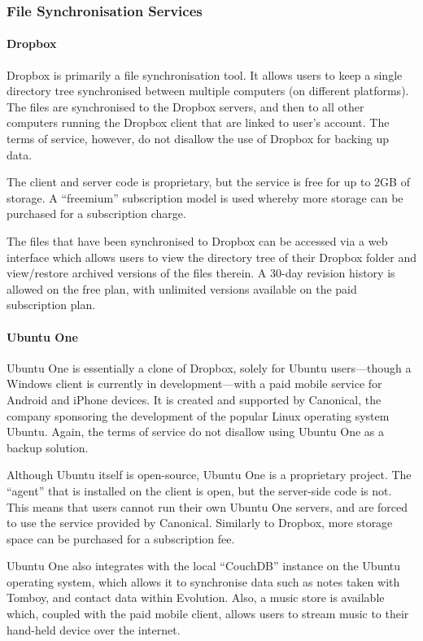 \begin{bibunit}[plain]
\subsubsection{File Synchronisation Services}

\paragraph{Dropbox}

Dropbox is primarily a file synchronisation tool. It allows users to keep
a single directory tree synchronised between multiple computers (on different
platforms). The files are synchronised to the Dropbox servers, and then to all
other computers running the Dropbox client that are linked to user's account.
The terms of service, however, do not disallow the use of Dropbox for backing
up data.

The client and server code is proprietary, but the service is free for up to
2GB of storage. A ``freemium'' subscription model is used whereby more storage
can be purchased for a subscription charge.

The files that have been synchronised to Dropbox can be accessed via a web
interface which allows users to view the directory tree of their Dropbox folder
and view/restore archived versions of the files therein. A 30-day revision
history is allowed on the free plan, with unlimited versions available on the
paid subscription plan.

\paragraph{Ubuntu One}

Ubuntu One is essentially a clone of Dropbox, solely for Ubuntu users---though
a Windows client is currently in development---with a paid mobile service for
Android and iPhone devices. It is created and supported by Canonical, the
company sponsoring the development of the popular Linux operating system
Ubuntu. Again, the terms of service do not disallow using Ubuntu One as
a backup solution.

Although Ubuntu itself is open-source, Ubuntu One is a proprietary project. The
``agent'' that is installed on the client is open, but the server-side code is
not. This means that users cannot run their own Ubuntu One servers, and are
forced to use the service provided by Canonical. Similarly to Dropbox, more storage space can
be purchased for a subscription fee.

Ubuntu One also integrates with the local ``CouchDB'' instance on the Ubuntu
operating system, which allows it to synchronise data such as notes taken with
Tomboy, and contact data within Evolution. Also, a music store is available
which, coupled with the paid mobile client, allows users to stream music to
their hand-held device over the internet.


\end{bibunit}
